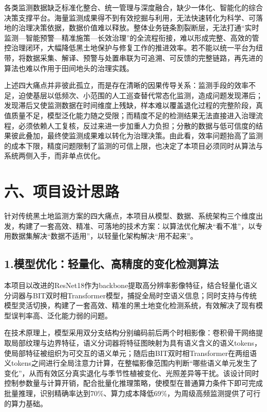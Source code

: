 各类监测数据缺乏标准化整合、统一管理与深度融合，缺少一体化、智能化的综合决策支撑平台。海量监测成果得不到有效挖掘与利用，无法快速转化为科学、可落地的治理决策依据，数据价值难以释放。整体业务链条割裂断层，无法打通“实时监测—智能预警—精准施策—长效治理”的全流程衔接，难以形成完整、高效的管控治理闭环，大幅降低黑土地保护与修复工作的推进效率。若不能以统一平台为纽带，将数据采集、解译、预警与处置串联为可追溯、可反馈的完整链路，再先进的算法也难以作用于田间地头的治理实践。

上述四大痛点并非彼此孤立，而是存在清晰的因果传导关系：监测手段的效率不足，迫使基层以低频次、小范围的人工巡查替代常态化监测，造成问题发现滞后；发现滞后又使监测数据在时间维度上残缺，样本难以覆盖退化过程的完整阶段，真值质量不足，模型泛化能力随之受限；而精度不足的检测结果无法直接进入治理流程，必须依赖人工复核，反过来进一步加重人力负担；分散的数据与低可信度的结果彼此叠加，最终使监测成果难以转化为治理决策。由此看，效率问题抬高了监测的成本下限，精度问题限制了监测的可信上限，也决定了本项目必须同时从算法与系统两侧入手，而非单点优化。

\section{六、项目设计思路}

针对传统黑土地监测方案的四大痛点，本项目从模型、数据、系统架构三个维度出发，构建了一套高效、精准、可落地的技术方案：以算法优化解决“看不准”，以专用数据集解决“数据不适用”，以轻量化架构解决“用不起来”。

\subsection{1.模型优化：轻量化、高精度的变化检测算法}

本项目以改进的ResNet18作为backbone提取高分辨率影像特征，结合轻量化语义分词器与BIT双时相Transformer模型，捕捉全局时空语义信息；同时支持与传统模型灵活切换，构建了一套高效、精准的黑土地变化检测系统，有效解决了现有模型误判率高、泛化能力弱的问题。

在技术原理上，模型采用双分支结构分别编码前后两个时相影像：卷积骨干网络提取局部纹理与边界特征，语义分词器将特征图映射为具有语义含义的语义tokens，使局部特征被组织为可交互的语义单元；随后由BIT双时相Transformer在两组语义tokens之间进行全局注意力计算，在整幅影像范围内判断“哪些语义单元发生了变化”，从而有效区分真实退化与季节性植被变化、光照差异等干扰。该设计同时控制参数量与计算开销，配合批量化推理策略，使模型在普通算力条件下即可完成批量推理，识别精确率达到70\%、算力成本降低69\%，为周级高频监测提供了可行的算力基础。

